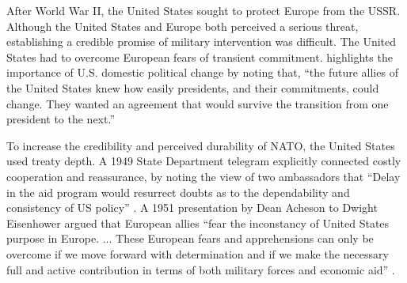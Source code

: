 \documentclass[12pt]{article}
\begin{document}
After World War II, the United States sought to protect Europe from the USSR. 
Although the United States and Europe both perceived a serious threat, establishing a credible promise of military intervention was difficult. 
The United States had to overcome European fears of transient commitment.
\citet[pg. 14]{Sayle2019} highlights the importance of U.S. domestic political change by noting that, ``the future allies of the United States knew how easily presidents, and their commitments, could change. They wanted an agreement that would survive the transition from one president to the next.'' 


To increase the credibility and perceived durability of NATO, the United States used treaty depth.  
A 1949 State Department telegram explicitly connected costly cooperation and reassurance, by noting the view of two ambassadors that ``Delay in the aid program would resurrect doubts as to the dependability and consistency of US policy'' \citep{state-summary-0607-49}. 
A 1951 presentation by Dean Acheson to Dwight Eisenhower argued that European allies ``fear the inconstancy of United States purpose in Europe. ... These European fears and apprehensions can only be overcome if we move forward with determination and if we make the necessary full and active contribution in terms of both military forces and economic aid'' \citep[pg. 3]{Acheson1951}. 
\end{document}
